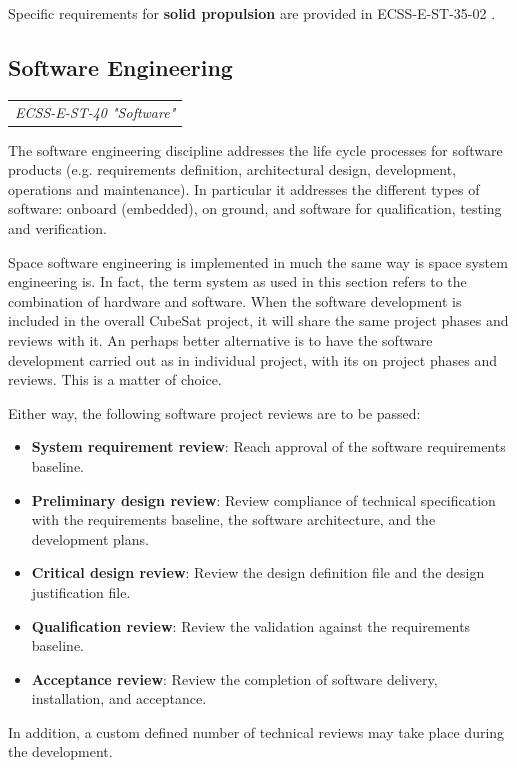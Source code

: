 Specific requirements for \textbf{solid propulsion} are provided in ECSS-E-ST-35-02 \cite{ECSS-E-ST-35-02}. 

\subsection{Software Engineering}

\begin{tabular}{l}
\textit{ECSS-E-ST-40 "Software" \cite{ECSS-E-ST-40} }
\end{tabular}

The software engineering discipline addresses the life cycle processes for software products (e.g. requirements definition, architectural design, development, operations and maintenance). In particular it addresses the different types of software: onboard (embedded), on ground, and software for qualification, testing and verification. 

Space software engineering is implemented in much the same way is space system engineering is. In fact, the term system as used in this section refers to the combination of hardware and software. When the software development is included in the overall CubeSat project, it will share the same project phases and reviews with it. An perhaps better alternative is to have the software development carried out as in individual project, with its on project phases and reviews. This is  a matter of choice. 

Either way, the following software project reviews are to be passed:

\begin{itemize}
\item \textbf{System requirement review}: Reach approval of the software requirements baseline.
\item \textbf{Preliminary design review}: Review compliance of technical specification with the requirements baseline, the software architecture, and the development plans.
\item \textbf{Critical design review}: Review the design definition file and the design justification file.
\item \textbf{Qualification review}: Review the validation against the requirements baseline.
\item \textbf{Acceptance review}: Review the completion of software delivery, installation, and acceptance.
\end{itemize}

In addition, a custom defined number of technical reviews may take place during the development. 

